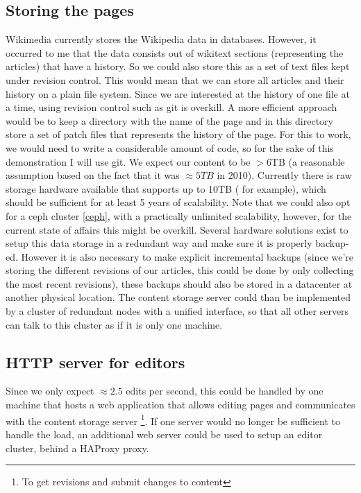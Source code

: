 \documentclass[12pt]{report}
\begin{document}
\subsection{Storing the pages}
Wikimedia currently stores the Wikipedia data in databases. However,
it occurred to me that the data consists out of wikitext sections
(representing the articles) that have a history. So we could also
store this as a set of text files kept under revision control.
This would mean that we can store all articles and their history on a
plain file system.
Since we are interested at the history of one file at a time, using 
revision control such as git is overkill. A more efficient
approach would be to keep a directory with the name of the page and in
this directory store a set of patch files that represents the history of the
page.
For this to work, we would need to write a considerable amount of code, so for the
sake of this demonstration I will use git.
We expect our content to be $>$6TB (a reasonable assumption based on
the fact that it was $\approx 5TB$ in 2010). Currently there is raw
storage hardware available that supports up to 10TB
(\cite{hp_10TB_storage} for example), which should be
sufficient for at least 5 years of scalability.
Note that we could also opt for a ceph cluster \cref{ceph}, with a
practically unlimited scalability, however, for the current state of
affairs this might be overkill.
Several hardware solutions exist to setup this data storage in a
redundant way and make sure it is properly backup-ed. However it is
also necessary to make explicit incremental backups (since
we're storing the different revisions of our articles, this could be
done by only collecting the most recent revisions), these backups
should also be stored in a datacenter at another physical location.
The content storage server could than be implemented by a cluster of
redundant nodes with a unified interface, so that all other servers
can talk to this cluster as if it is only one machine.

\subsection{HTTP server for editors}
Since we only expect $\approx 2.5$ edits per second, this could be
handled by one machine that hosts a web application that allows
editing pages and communicates with the content storage server \footnote{To get
revisions and submit changes to content}.
If one server would no longer be sufficient to handle the load, an
additional web server could be used to setup an editor cluster, behind
a HAProxy proxy.
\end{document}
